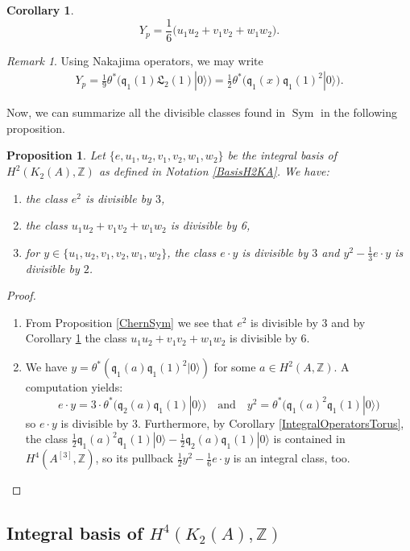 \documentclass{alggeom}
\DeclareMathOperator{\Sym}{Sym}
\newcommand{\hilb}[1]{^{[#1]}}
\newcommand{\vac}{|0\rangle}
\newcommand{\q}{\mathfrak{q}}
\newcommand{\kum}[2]{K_{ #2 }( #1 )}
\newcommand{\X}{\kum{A}{2}}
\newcommand{\Z}{\mathbb{Z}}
\theoremstyle{plain}
\newtheorem{proposition}[theorem]{Proposition}
\newtheorem{corollary}[theorem]{Corollary}
\theoremstyle{definition}
\theoremstyle{remark}
\newtheorem{remark}[theorem]{Remark}
\begin{document}
\begin{corollary}\label{Classuvw}
\begin{equation} \label{YSym}
Y_p =  \frac{1}{6}\Big(u_1u_2 + v_1v_2 +  w_1 w_2 \Big).
\end{equation}
\end{corollary}
\begin{remark}\label{afterClassuvw}
Using Nakajima operators, we may write
\begin{gather}
Y_p = \frac{1}{9} \theta^*\Big( \q_1(1)\mathfrak L_2(1) \vac \Big) =  \frac{1}{2}\theta^*\Big(\q_1(x)\q_1(1)^2\vac\Big).
\end{gather}
\end{remark}
Now, we can summarize all the divisible classes found in $\Sym$ in the following proposition. 
\begin{proposition}\label{classedivisibleSym}
Let $\{e,u_1,u_2,v_1,v_2,w_1,w_2\}$ be the integral basis of $H^2(\X,\Z)$ as defined in Notation \ref{BasisH2KA}. 
We have:
\begin{enumerate}
\item
the class $e^2$ is divisible by $3$, 
\item
the class $u_1u_2 + v_1v_2+w_1w_2$ is divisible by 6,
\item
for $y\in\{u_1,u_2,v_1,v_2,w_1,w_2\}$, the class 
$
e \cdot y
$
is divisible by $3$ and 
$
 y^2 - \frac{1}{3} e\cdot y
$
is divisible by $2$.
\end{enumerate}
\end{proposition}
\begin{proof}
\begin{enumerate}
\item
From Proposition \ref{ChernSym} we see that
$e^2$ is divisible by $3$ and by Corollary \ref{Classuvw}
the class $u_1u_2 + v_1v_2+w_1w_2$ is divisible by 6.
\item
We have $y= \theta^*\left(\q_1(a)\q_1(1)^2\vac\right)$ for some $a\in H^2(A,\Z)$. A computation yields:
$$
e\cdot y = 3\cdot \theta^*\Big( \q_2(a)\q_1(1)\vac \Big)
\quad \text{and}\quad
y^2 = \theta^*\Big(\q_1(a)^2\q_1(1)\vac\Big)
$$
so $e\cdot y$ is divisible by $3$. Furthermore, by Corollary \ref{IntegralOperatorsTorus}, the class 
$
\frac{1}{2} \q_1(a)^2\q_1(1)\vac - \frac{1}{2} \q_2(a)\q_1(1)\vac 
$
is contained in $H^4(A\hilb{3},\Z)$, so its pullback
$
 \frac{1}{2}y^2 - \frac{1}{6} e\cdot y
$
is an integral class, too.
\end{enumerate}
\end{proof}
\subsection{Integral basis of $H^4(K_2(A),\Z)$}\label{integralbasisH4}
\end{document}
